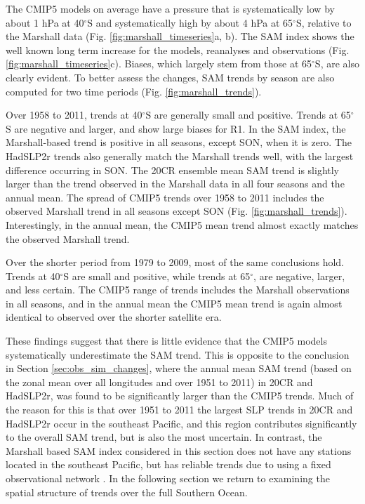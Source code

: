 \documentclass{ametsoc}
\begin{document}
The CMIP5 models on average have a pressure that is systematically low by about 1 hPa at 40$^{\circ}$S
and systematically high by about 4 hPa at 65$^{\circ}$S, relative to the Marshall data 
(Fig. \ref{fig:marshall_timeseries}a, b). The SAM index shows the well known long term increase for the 
models, reanalyses and observations (Fig. \ref{fig:marshall_timeseries}c). Biases, which largely stem 
from those at 65$^{\circ}$S, are also clearly evident. To better assess the changes, SAM trends by 
season are also computed for two time periods (Fig. \ref{fig:marshall_trends}). 

Over 1958 to 2011,
trends at 40$^{\circ}$S are generally small and positive. Trends at 65$^{\circ}$S are negative and
larger, and show large biases for R1. In the SAM index, the Marshall-based trend is positive in all
seasons, except SON, when it is zero. The HadSLP2r trends also generally match the Marshall trends
well, with the largest difference occurring in SON. The 20CR ensemble mean SAM trend is slightly larger 
than the trend observed in the Marshall data in all
four seasons and the annual mean. The spread of CMIP5 trends over 1958 to 2011 includes 
the observed Marshall trend in all seasons except SON (Fig. \ref{fig:marshall_trends}). Interestingly, 
in the annual mean, the CMIP5 mean trend almost exactly matches the observed Marshall trend.

Over the shorter period from 1979 to 2009, most of the same conclusions 
hold. Trends at 40$^{\circ}$S are small and positive, while trends at 65$^{\circ}$, are negative, larger, 
and less certain. The CMIP5 range of trends includes the Marshall observations in all seasons, 
and in the annual mean the CMIP5 mean trend is again almost identical to observed over the shorter
satellite era. 

These findings suggest that there is little evidence that the CMIP5 models 
systematically  underestimate the SAM trend. This is opposite to the conclusion in 
Section \ref{sec:obs_sim_changes}, where the annual mean SAM trend (based on the zonal mean 
over all longitudes and over 1951 to 2011) in 20CR and HadSLP2r, was found to be significantly 
larger than the CMIP5 trends. Much of the reason for this is that over 1951 to 2011 the largest
SLP trends in 20CR and HadSLP2r occur in the southeast Pacific, and this region contributes
significantly to the overall SAM trend, but is also the most uncertain. In contrast, the 
Marshall based SAM index considered in this section does not have any stations located in the 
southeast Pacific, but has reliable trends due to using a fixed 
observational network \citep{Marshall_2003}. In the following section we return to examining the spatial structure of 
trends over the full Southern Ocean.
\end{document}
